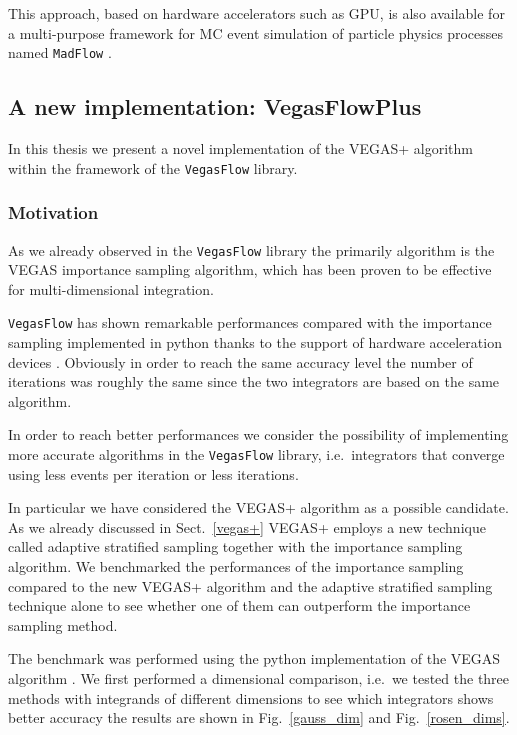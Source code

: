 \documentclass[../main/main.tex]{subfiles}
\begin{document}
This approach, based on hardware accelerators such as GPU, is also available for a multi-purpose framework for MC event simulation of particle physics processes named 	\texttt{MadFlow} \cite{Carrazza:2021gpx, Carrazza:2021zug}.

 
 
 
 
\subsection{A new implementation: VegasFlowPlus}
In this thesis we present a novel implementation of the VEGAS+ algorithm within the framework of the \texttt{VegasFlow} library.
\subsubsection{Motivation}
As we already observed in the \texttt{VegasFlow} library the primarily algorithm is the VEGAS importance sampling algorithm, which has been proven to be effective for multi-dimensional integration.

\texttt{VegasFlow} has shown remarkable performances compared with the importance sampling  implemented in python \cite{peter_lepage_2021_4746454} thanks to the support of hardware acceleration devices . Obviously in order to reach the same accuracy level the number of iterations was roughly the same since the two integrators are based on the same algorithm.

In order to reach better performances we consider the possibility of implementing more accurate algorithms in the \texttt{VegasFlow} library, i.e.\ integrators that converge using less events per iteration or less iterations. 

In particular we have considered the VEGAS+ algorithm as a possible candidate. 
As we already discussed in Sect.~\ref{vegas+} VEGAS+ employs a new technique called adaptive stratified sampling together with the importance sampling algorithm. 
We benchmarked the performances of the importance sampling compared to the new VEGAS+ algorithm and the adaptive stratified sampling technique alone to see whether one of them can outperform the importance sampling method.

The benchmark was performed using the python implementation of the VEGAS algorithm \cite{peter_lepage_2021_4746454}.
We first performed a dimensional comparison, i.e.\ we tested the three methods with integrands of different dimensions to see which integrators shows better accuracy the results are shown in Fig.~\ref{gauss_dim} and Fig.~\ref{rosen_dims}.
\end{document}
